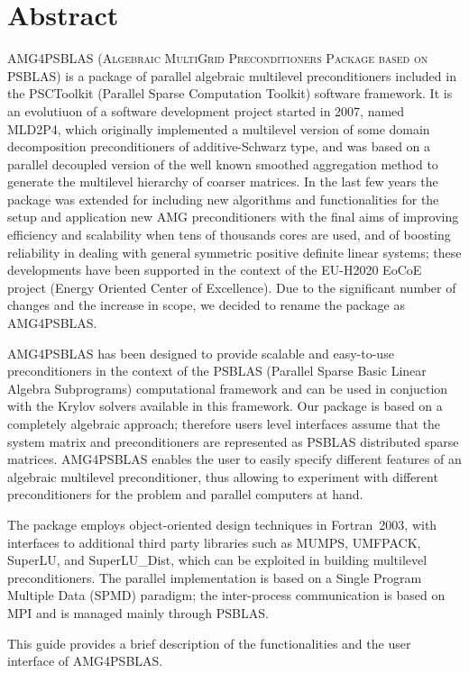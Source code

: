 \section*{Abstract}
\ifpdf
{}
\fi

\textsc{AMG4PSBLAS (Algebraic MultiGrid Preconditioners Package
based on PSBLAS}) is a package of parallel algebraic multilevel
preconditioners included in the PSCToolkit (Parallel Sparse
Computation Toolkit) software framework. 
It is an evolutiuon of a software development project started in 2007,
named MLD2P4, which originally implemented a  
multilevel version of some domain decomposition preconditioners of
additive-Schwarz type, and was based on a parallel decoupled version
of the well known smoothed 
aggregation method to generate the multilevel hierarchy of coarser matrices. 
In the last few years the package was extended for
including new algorithms and  
functionalities for the  setup and application new AMG preconditioners
with the final aims of improving efficiency and scalability when tens
of thousands cores are  used, and of boosting reliability in dealing
with general symmetric positive definite linear systems; these
developments have been supported in the context of the EU-H2020 EoCoE
project (Energy Oriented Center of Excellence).  
Due to the significant number of changes and the increase in scope, we
decided to rename the package as AMG4PSBLAS. 

AMG4PSBLAS has been designed to provide scalable and easy-to-use
preconditioners in the context of the PSBLAS (Parallel Sparse Basic
Linear Algebra Subprograms) computational framework and can be used in
conjuction with the Krylov solvers available in this framework.
Our package is based on a completely algebraic approach; therefore
users level interfaces assume that the system matrix and
preconditioners are represented as PSBLAS distributed sparse matrices.
AMG4PSBLAS enables the user to easily specify different
features of an algebraic multilevel preconditioner, thus allowing to
experiment with different preconditioners for the problem and parallel
computers at hand. 

The package employs object-oriented design techniques in
Fortran~2003, with interfaces to additional third party libraries 
such as MUMPS, UMFPACK, SuperLU, and SuperLU\_Dist, which
can be exploited in building multilevel preconditioners. The parallel 
implementation is based on a Single Program Multiple Data (SPMD)
paradigm; the inter-process communication is based on MPI and
is managed mainly through PSBLAS.

This guide provides a brief description of the functionalities and
the user interface of AMG4PSBLAS. 
